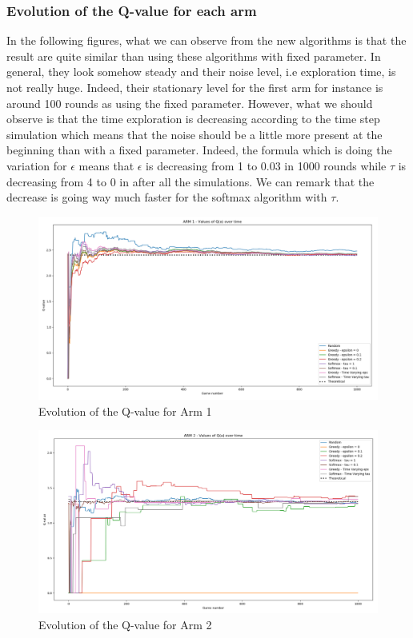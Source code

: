 \documentclass{article}
\begin{document}
\subsubsection{Evolution of the Q-value for each arm}

In the following figures, what we can observe from the new algorithms is that the result are quite similar than using these algorithms with fixed parameter. In general, they look somehow steady and their noise level, i.e exploration time, is not really huge. Indeed, their stationary level for the first arm for instance is around 100 rounds as using the fixed parameter. However, what we should observe is that the time exploration is decreasing according to the time step simulation which means that the noise should be a little more present at the beginning than with a fixed parameter. Indeed, the formula which is doing the variation for $\epsilon$ means that $\epsilon$ is decreasing from 1 to 0.03 in 1000 rounds while $\tau$ is decreasing from 4 to 0 in after all the simulations. We can remark that the decrease is going way much faster for the softmax algorithm with $\tau$.   

\begin{figure}[H]
  \centering
  \includegraphics[scale=0.35]{fig/bandit3-arm1.png}
  \caption{Evolution of the Q-value for Arm 1}
  \label{fig:bandit3-arm1}
\end{figure}

\begin{figure}[H]
  \centering
  \includegraphics[scale=0.37]{fig/bandit3-arm2.png}
  \caption{Evolution of the Q-value for Arm 2}
  \label{fig:bandit3-arm2}
\end{figure}
\end{document}
